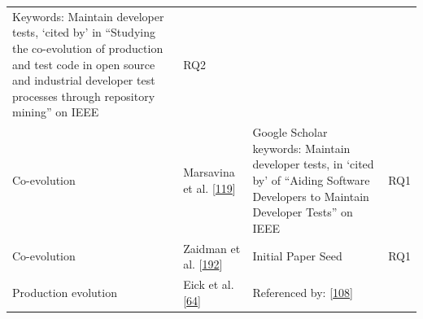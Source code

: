 \documentclass[]{book}
\begin{document}
\begin{longtable}[]{@{}llll@{}}
\begin{minipage}[t]{0.50\columnwidth}
Keywords: Maintain developer tests, `cited by' in ``Studying the
co-evolution of production and test code in open source and industrial
developer test processes through repository mining'' on IEEE\strut
\end{minipage} & \begin{minipage}[t]{0.04\columnwidth}\raggedright\strut
RQ2\strut
\end{minipage}\tabularnewline
\begin{minipage}[t]{0.18\columnwidth}\raggedright\strut
Co-evolution\strut
\end{minipage} & \begin{minipage}[t]{0.16\columnwidth}\raggedright\strut
Marsavina et al. {[}\protect\hyperlink{ref-marsavina2014}{119}{]}\strut
\end{minipage} & \begin{minipage}[t]{0.50\columnwidth}\raggedright\strut
Google Scholar keywords: Maintain developer tests, in `cited by' of
``Aiding Software Developers to Maintain Developer Tests'' on IEEE\strut
\end{minipage} & \begin{minipage}[t]{0.04\columnwidth}\raggedright\strut
RQ1\strut
\end{minipage}\tabularnewline
\begin{minipage}[t]{0.18\columnwidth}\raggedright\strut
Co-evolution\strut
\end{minipage} & \begin{minipage}[t]{0.16\columnwidth}\raggedright\strut
Zaidman et al.
{[}\protect\hyperlink{ref-zaidman2011studying}{192}{]}\strut
\end{minipage} & \begin{minipage}[t]{0.50\columnwidth}\raggedright\strut
Initial Paper Seed\strut
\end{minipage} & \begin{minipage}[t]{0.04\columnwidth}\raggedright\strut
RQ1\strut
\end{minipage}\tabularnewline
\begin{minipage}[t]{0.18\columnwidth}\raggedright\strut
Production evolution\strut
\end{minipage} & \begin{minipage}[t]{0.16\columnwidth}\raggedright\strut
Eick et al. {[}\protect\hyperlink{ref-eick2001}{64}{]}\strut
\end{minipage} & \begin{minipage}[t]{0.50\columnwidth}\raggedright\strut
Referenced by: {[}\protect\hyperlink{ref-leung2015testing}{108}{]}\strut

\end{minipage}
\end{longtable}
\end{document}
